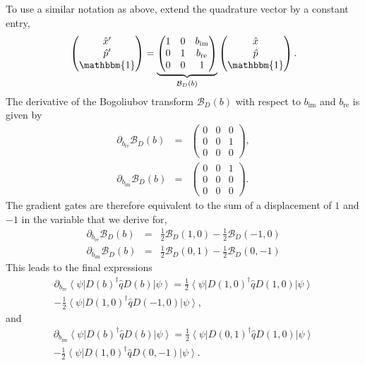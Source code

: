 \documentclass[aps,pra,10pt,twocolumn,groupedaddress,nofootinbib]{revtex4-1}
\theoremstyle{plain}
\newcommand{\ket}[1]{\ensuremath{\left| #1 \right \rangle}}
\newcommand{\bra}[1]{\ensuremath{\left \langle #1 \right |}}
\newcommand{\x}{\hat{x}}
\newcommand{\p}{\hat{p}}
\begin{document}
To use a similar notation as above, extend the quadrature vector by a constant entry,
\begin{equation}
\begin{pmatrix}
  \x' \\ \p' \\ \mathbbm{1}
\end{pmatrix}
 = 
\underbrace{\begin{pmatrix}
1 & 0 & b_{\mathrm{im}}  \\
0 & 1 & b_{\mathrm{re}} \\
0 & 0 & 1
\end{pmatrix}}_{\mathcal{B}_D(b)}
\begin{pmatrix}
\x \\ \p \\ \mathbbm{1}
\end{pmatrix}.
\end{equation}
The derivative of the Bogoliubov transform $\mathcal{B}_D(b)$ with respect to $b_{\mathrm{im}}$ and $b_{\mathrm{re}}$ is given by 
\begin{eqnarray*}
\partial_{b_{\mathrm{re}}} \mathcal{B}_D(b) &=& \begin{pmatrix}
0 & 0 & 0  \\
0 & 0 & 1 \\
0 & 0 & 0
\end{pmatrix},\\
\partial_{b_{\mathrm{im}}} \mathcal{B}_D(b) &=& \begin{pmatrix}
0 & 0 & 1  \\
0 & 0 & 0 \\
0 & 0 & 0
\end{pmatrix}.
\end{eqnarray*}
The gradient gates are therefore equivalent to the sum of a displacement of $1$ and $-1$ in the variable that we derive for, 
\begin{eqnarray*}
\partial_{b_{\mathrm{re}}} \mathcal{B}_D(b) &=& \frac{1}{2} \mathcal{B}_D(1, 0) - \frac{1}{2} \mathcal{B}_D(-1, 0) \\
\partial_{b_{\mathrm{im}}} \mathcal{B}_D(b) &=& \frac{1}{2} \mathcal{B}_D(0, 1) - \frac{1}{2} \mathcal{B}_D(0, -1)
\end{eqnarray*}
This leads to the final expressions
\begin{multline} 
\partial_{b_{\mathrm{re}}}\bra{\psi} D(b)^{\dagger} \hat{q} D(b) \ket{\psi} =  \frac{1}{2}\bra{\psi} D(1,0)^{\dagger} \hat{q} D(1,0) \ket{\psi} \\
- \frac{1}{2}\bra{\psi} D(1,0)^{\dagger} \hat{q} D(-1,0) \ket{\psi}, 
\end{multline}
and
\begin{multline} 
\partial_{b_{\mathrm{im}}}\bra{\psi} D(b)^{\dagger} \hat{q} D(b) \ket{\psi} =  \frac{1}{2}\bra{\psi} D(0,1)^{\dagger} \hat{q} D(1,0) \ket{\psi} \\ 
- \frac{1}{2}\bra{\psi} D(1,0)^{\dagger} \hat{q} D(0,-1) \ket{\psi} . 
\end{multline}
\end{document}
